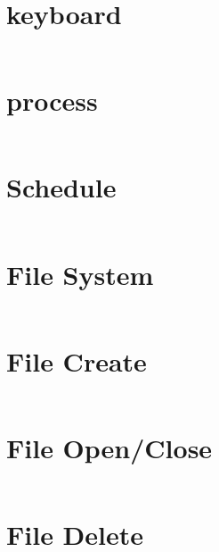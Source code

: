 \section{keyboard}
\label{sec:keyb}
\inputminted{c}{./code/keyboard.c}

\section{process}
\label{sec:process}
\inputminted{c}{./code/process.c}

\section{Schedule}
\label{fsec:schedule}
\inputminted{c}{./code/schedule.c}

\section{File System}
\label{app:partitionformat}
\inputminted{c}{./code/fs_sys.c}

\section{File Create}
\label{app:filecreate}
\inputminted{c}{./code/fs_create.c}

\section{File Open/Close}
\label{app:fileopen}
\inputminted{c}{./code/fs_open.c}

\section{File Delete}
\label{app:filedel}
\inputminted{c}{./code/fs_del.c}

